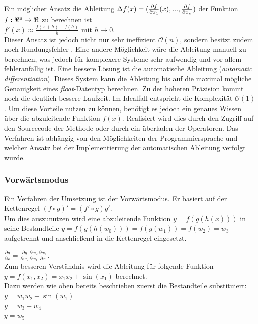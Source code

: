 \documentclass{like}
\begin{document}
Ein möglicher Ansatz die Ableitung $\Delta{\tiny } f(x) = (\frac{\partial f}{\partial x_1} (x), ..., \frac{\partial f}{\partial x_n})$ der Funktion $f:\Re \textsuperscript{n} \rightarrow \Re $ zu berechnen ist \\
$f'(x) \approx \frac{f(x+h) - f(h)}{h}$ mit $ h \rightarrow 0 $. \\
Dieser Ansatz ist jedoch nicht nur sehr ineffizient $\mathcal{O}(n)$, sondern besitzt zudem noch Rundungsfehler \cite{julDiff}.
Eine andere Möglichkeit wäre die Ableitung manuell zu berechnen, was jedoch für komplexere Systeme sehr aufwendig und vor allem fehleranfällig ist. Eine bessere Lösung ist die automatische Ableitung (\emph{automatic differentiation}). 
Dieses System kann die Ableitung bis auf die maximal mögliche Genauigkeit eines \textit{float}-Datentyp berechnen. Zu der höheren Präzision kommt noch die deutlich bessere Laufzeit. Im Idealfall entspricht die Komplexität $\mathcal{O}(1)$ \cite{julDiff}. Um diese Vorteile nutzen zu können, benötigt es jedoch ein genaues Wissen über die abzuleitende Funktion \(f(x)\). Realisiert wird dies durch den Zugriff auf den Sourcecode der Methode oder durch ein überladen der Operatoren. Das Verfahren ist abhängig von den Möglichkeiten der Programmiersprache und welcher Ansatz bei der Implementierung der automatischen Ableitung verfolgt wurde. 


\subsubsection*{Vorwärtsmodus}
Ein Verfahren der Umsetzung ist der Vorwärtsmodus. Er basiert auf der Kettenregel $(f \circ g)' = (f' \circ g)g'$. \\
Um dies auszunutzen wird eine abzuleitende Funktion $ y = f(g(h(x)))$ in seine Bestandteile $y = f(g(h(w_0))) = f(g(w_1)) = f(w_2) = w_3$ aufgetrennt und anschließend in die Kettenregel eingesetzt. 

$\frac{\partial y}{\partial x} = \frac{\partial y}{\partial w_2} \frac{\partial w_2}{\partial w_1} \frac{\partial w_1}{\partial x}$. \\
Zum besseren Verständnis wird die Ableitung für folgende Funktion
$y = f(x_1, x_2) = x_1x_2 + \sin(x_1)$ berechnet.\\
Dazu werden wie oben bereits beschrieben zuerst die Bestandteile substituiert:\\
$y = w_1w_2 + \sin(w_1) $ \\
$y = w_3 + w_4$ \\
$y = w_5$
\end{document}
